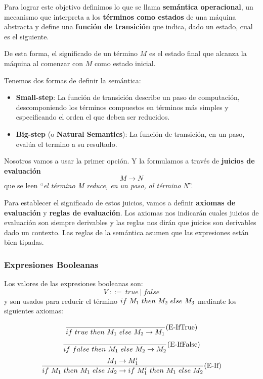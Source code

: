 Para lograr este objetivo definimos lo que se llama \textbf{semántica operacional}, un mecanismo que interpreta a los \textbf{términos como estados} de una máquina abstracta y define una \textbf{función de transición} que indica, dado un estado, cual es el siguiente.

De esta forma, el significado de un término $M$ es el estado final que alcanza la máquina al comenzar con $M$ como estado inicial.

Tenemos dos formas de definir la semántica:
\begin{itemize}
    \item \textbf{Small-step}: La función de transición describe un paso de computación, descomponiendo los términos compuestos en términos más simples y especificando el orden el que deben ser reducidos.
    \item \textbf{Big-step} (o \textbf{Natural Semantics}): La función de transición, en un paso, evalúa el termino a su resultado.
\end{itemize}

Nosotros vamos a usar la primer opción. Y la formulamos a través de \textbf{juicios de evaluación} 
$$M\to N$$ que se leen ``\textit{el término M reduce, en un paso, al término N}''.

Para establecer el significado de estos juicios, vamos a definir \textbf{axiomas de evaluación} y \textbf{reglas de evaluación}. Los axiomas nos indicarán cuales juicios de evaluación son siempre derivables y las reglas nos dirán que juicios son derivables dado un contexto. Las reglas de la semántica asumen que las expresiones están bien tipadas.

\subsubsection{Expresiones Booleanas}\label{calculo_lambda:semantica:booleanas}
Los valores de las  expresiones booleanas son:
$$ V~::=~true~|~false$$
y son usados para reducir el término $if~ M_1~ then~ M_2~ else~ M_3$ mediante los siguientes axiomas:

\begin{equation*}
\frac{}{if~ true~ then~ M_1~ else~ M_2 \to M_1}(\text{E-IfTrue})
\end{equation*}
\vspace*{5mm}
\begin{equation*}
\frac{}{if~ false~ then~ M_1~ else~ M_2 \to M_2}(\text{E-IfFalse})
\end{equation*}
\vspace*{5mm}
\begin{equation*}
\frac{M_1\to M'_1}{if~ M_1~ then~ M_1~ else~ M_2\to if~ M'_1~ then~ M_1~ else~ M_2}(\text{E-If})
\end{equation*}

